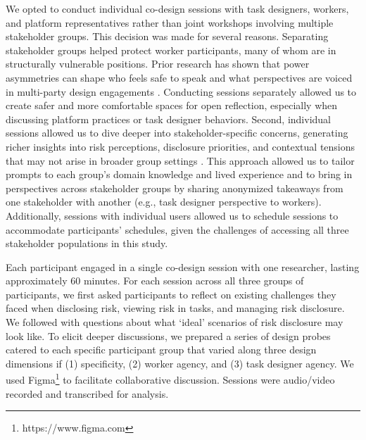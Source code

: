 We opted to conduct individual co-design sessions with task designers, workers, and platform representatives rather than joint workshops involving multiple stakeholder groups. This decision was made for several reasons. Separating stakeholder groups helped protect worker participants, many of whom are in structurally vulnerable positions. Prior research has shown that power asymmetries can shape who feels safe to speak and what perspectives are voiced in multi-party design engagements \cite{tang2024ai}. Conducting sessions separately allowed us to create safer and more comfortable spaces for open reflection, especially when discussing platform practices or task designer behaviors. Second, individual sessions allowed us to dive deeper into stakeholder-specific concerns, generating richer insights into risk perceptions, disclosure priorities, and contextual tensions that may not arise in broader group settings \cite{dillahunt2017reflections}. This approach allowed us to tailor prompts to each group’s domain knowledge and lived experience and to bring in perspectives across stakeholder groups by sharing anonymized takeaways from one stakeholder with another (e.g., task designer perspective to workers). 
Additionally, sessions with individual users allowed us to schedule sessions to accommodate participants' schedules, given the challenges of accessing all three stakeholder populations in this study. 


Each participant engaged in a single co-design session with one researcher, lasting approximately 60 minutes. For each session across all three groups of participants, we first asked participants to reflect on existing challenges they faced when disclosing risk, viewing risk in tasks, and managing risk disclosure. We followed with questions about what `ideal' scenarios of risk disclosure may look like. To elicit deeper discussions, we prepared a series of design probes catered to each specific participant group that varied along three design dimensions if (1) specificity, (2) worker agency, and (3) task designer agency. We used Figma\footnote{https://www.figma.com} to facilitate collaborative discussion. Sessions were audio/video recorded and transcribed for analysis.


